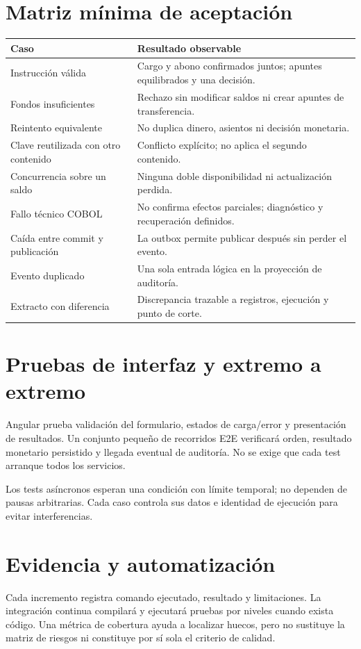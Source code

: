 \section{Matriz mínima de aceptación}
\begin{longtable}{L{0.36\textwidth}L{0.56\textwidth}}
\textbf{Caso} & \textbf{Resultado observable}\\\hline
Instrucción válida & Cargo y abono confirmados juntos; apuntes equilibrados y una decisión.\\
Fondos insuficientes & Rechazo sin modificar saldos ni crear apuntes de transferencia.\\
Reintento equivalente & No duplica dinero, asientos ni decisión monetaria.\\
Clave reutilizada con otro contenido & Conflicto explícito; no aplica el segundo contenido.\\
Concurrencia sobre un saldo & Ninguna doble disponibilidad ni actualización perdida.\\
Fallo técnico COBOL & No confirma efectos parciales; diagnóstico y recuperación definidos.\\
Caída entre commit y publicación & La outbox permite publicar después sin perder el evento.\\
Evento duplicado & Una sola entrada lógica en la proyección de auditoría.\\
Extracto con diferencia & Discrepancia trazable a registros, ejecución y punto de corte.\\
\end{longtable}

\section{Pruebas de interfaz y extremo a extremo}
Angular prueba validación del formulario, estados de carga/error y presentación de resultados. Un conjunto pequeño de recorridos E2E verificará orden, resultado monetario persistido y llegada eventual de auditoría. No se exige que cada test arranque todos los servicios.

Los tests asíncronos esperan una condición con límite temporal; no dependen de pausas arbitrarias. Cada caso controla sus datos e identidad de ejecución para evitar interferencias.

\section{Evidencia y automatización}
Cada incremento registra comando ejecutado, resultado y limitaciones. La integración continua compilará y ejecutará pruebas por niveles cuando exista código. Una métrica de cobertura ayuda a localizar huecos, pero no sustituye la matriz de riesgos ni constituye por sí sola el criterio de calidad.
